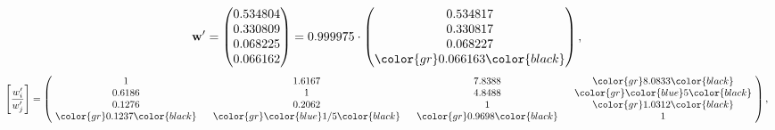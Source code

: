 \begin{example}
\begin{equation*}
\mathbf{w}^{\prime} =
\begin{pmatrix}
0.534804\\
0.330809\\
0.068225\\
0.066162
\end{pmatrix} =
0.999975\cdot
\begin{pmatrix}
0.534817\\
0.330817\\
0.068227\\
\color{gr} 0.066163\color{black}
\end{pmatrix},
\end{equation*}
\begin{equation*}
\left[ \frac{{w}^{\prime}_i}{{w}^{\prime}_j} \right] =
\begin{pmatrix}
$\,\,$ 1 $\,\,$ & $\,\,$1.6167$\,\,$ & $\,\,$7.8388$\,\,$ & $\,\,$\color{gr} 8.0833\color{black} $\,\,$ \\
$\,\,$0.6186$\,\,$ & $\,\,$ 1 $\,\,$ & $\,\,$4.8488$\,\,$ & $\,\,$\color{gr} \color{blue} 5\color{black}   $\,\,$ \\
$\,\,$0.1276$\,\,$ & $\,\,$0.2062$\,\,$ & $\,\,$ 1 $\,\,$ & $\,\,$\color{gr} 1.0312\color{black}  $\,\,$ \\
$\,\,$\color{gr} 0.1237\color{black} $\,\,$ & $\,\,$\color{gr} \color{blue}  1/5\color{black} $\,\,$ & $\,\,$\color{gr} 0.9698\color{black} $\,\,$ & $\,\,$ 1  $\,\,$ \\
\end{pmatrix},
\end{equation*}
\end{example}
\newpage
